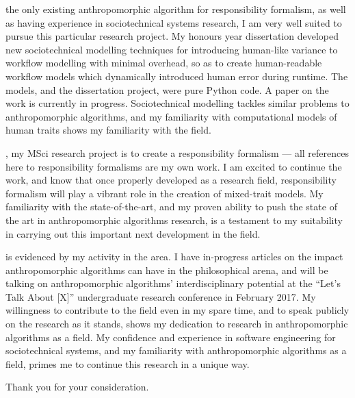  the only existing anthropomorphic algorithm for responsibility formalism, as well as having experience in sociotechnical systems research, I am very well suited to pursue this particular research project. My honours year dissertation developed new sociotechnical modelling techniques for introducing human-like variance to workflow modelling with minimal overhead, so as to create human-readable workflow models which dynamically introduced human error during runtime. The models, and the dissertation project, were pure Python code. A paper on the work is currently in progress.\cite{wallis_2016_b} Sociotechnical modelling tackles similar problems to anthropomorphic algorithms, and my familiarity with computational models of human traits shows my familiarity with the field.\par

, my MSci research project is to create a responsibility formalism --- all references here to responsibility formalisms are my own work. I am excited to continue the work, and know that once properly developed as a research field, responsibility formalism will play a vibrant role in the creation of mixed-trait models. My familiarity with the state-of-the-art, and my proven ability to push the state of the art in anthropomorphic algorithms research, is a testament to my suitability in carrying out this important next development in the field.\par

 is evidenced by my activity in the area. I have in-progress articles on the impact anthropomorphic algorithms can have in the philosophical arena, and will be talking on anthropomorphic algorithms' interdisciplinary potential at the ``Let's Talk About [X]'' undergraduate research conference in February 2017. My willingness to contribute to the field even in my spare time, and to speak publicly on the research as it stands, shows my dedication to research in anthropomorphic algorithms as a field. My confidence and experience in software engineering for sociotechnical systems, and my familiarity with anthropomorphic algorithms as a field, primes me to continue this research in a unique way.\par

\bigskip

Thank you for your consideration.\par




